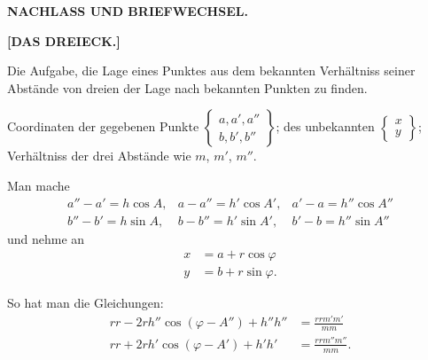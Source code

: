 \begin{center}
\textbf{\Large NACHLASS UND BRIEFWECHSEL.}\par\bigskip
\textbf{[DAS DREIECK.]}
\end{center}
\bigskip

Die Aufgabe, die Lage eines Punktes aus dem bekannten Verhältniss seiner Abstände von dreien der Lage nach bekannten Punkten zu finden.

Coordinaten der gegebenen Punkte $\left\{\begin{array}{c}a,a',a''\\b,b',b''\end{array}\right\}$; des unbekannten $\left\{\begin{array}{c}x\\y\end{array}\right\}$; Verhältniss der drei Abstände wie $m$, $m'$, $m''$.


Man mache
\[
\begin{array}{lll}
a''-a'=h\cos A,&a-a''=h'\cos A',&a'-a=h''\cos A''\\
b''-b'=h\sin A,&b-b''=h'\sin A',&b'-b=h''\sin A''
\end{array}
\]
\noindent und nehme an
\[
\begin{aligned}
x&=a+r\cos\varphi\\
y&=b+r\sin\varphi.
\end{aligned}
\]

So hat man die Gleichungen:
\[
\begin{aligned}
rr-2rh''\cos(\varphi-A'')+h''h''&=\frac{rrm'm'}{mm}\\
rr+2rh'\cos(\varphi-A')+h'h'&=\frac{rrm''m''}{mm}.
\end{aligned}
\]
\begin{center}\end{center}
